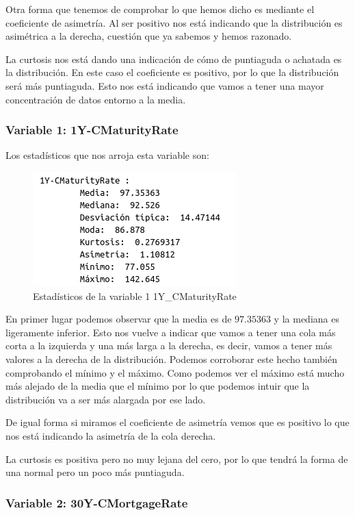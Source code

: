 \documentclass[12pt,a4paper]{article}
\begin{document}
Otra forma que tenemos de comprobar lo que hemos dicho es mediante el coeficiente de asimetría. Al ser positivo nos está indicando que la distribución es asimétrica a la derecha, cuestión que ya sabemos y hemos razonado.

La curtosis nos está dando una indicación de cómo de puntiaguda o achatada es la distribución. En este caso el coeficiente es positivo, por lo que la distribución será más puntiaguda. Esto nos está indicando que vamos a tener una mayor concentración de datos entorno a la media.

\subsubsection*{Variable 1: 1Y-CMaturityRate}

Los estadísticos que nos arroja esta variable son:

\begin{figure}[H]
	\centering
	\includegraphics[scale=0.7]{./Imagenes/EDA/Regresion/estadisticos_1Y_CMaturityRate.png}
	\caption{Estadísticos de la variable 1 1Y\_CMaturityRate}
\end{figure}

En primer lugar podemos observar que la media es de $97.35363$ y la mediana es ligeramente inferior. Esto nos vuelve a indicar que vamos a tener una cola más corta a la izquierda y una más larga a la derecha, es decir, vamos a tener más valores a la derecha de la distribución. Podemos corroborar este hecho también comprobando el mínimo y el máximo. Como podemos ver el máximo está mucho más alejado de la media que el mínimo por lo que podemos intuir que la distribución va a ser más alargada por ese lado.

De igual forma si miramos el coeficiente de asimetría vemos que es positivo lo que nos está indicando la asimetría de la cola derecha.

La curtosis es positiva pero no muy lejana del cero, por lo que tendrá la forma de una normal pero un poco más puntiaguda.

\subsubsection*{Variable 2: 30Y-CMortgageRate}
\end{document}
